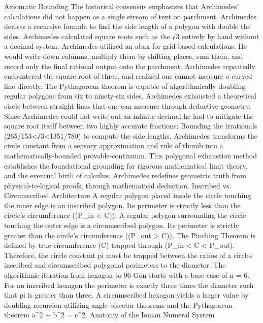 Axiomatic Bounding
The historical consensus emphasizes that Archimedes’ calculations did not happen as a single stream of text on parchment. Archimedes derives a recursive formula to find the side length of a polygon with double the sides. Archimedes calculated square roots such as the √3 entirely by hand without a decimal system. Archimedes utilized an abax for grid-based calculations. He would write down columns, multiply them by shifting places, sum them, and record only the final rational output onto the parchment. Archimedes repeatedly encountered the square root of three, and realized one cannot measure a curved line directly. The Pythagorean theorem is capable of algorithmically doubling regular polygons from six to ninety-six sides. Archimedes exhausted a theoretical circle between straight lines that one can measure through deductive geometry. Since Archimedes could not write out an infinite decimal he had to mitigate the square root itself between two highly accurate fractions:
Bounding the irrationals ({265}/{153}<{√3}<{1351}/{780}) to compute the side lengths.
Archimedes transforms the circle constant from a sensory approximation and rule of thumb into a mathematically-bounded provable-continuum. This polygonal exhaustion method establishes the foundational grounding for rigorous mathematical limit theory, and the eventual birth of calculus. Archimedes redefines geometric truth from physical-to-logical proofs, through mathematical deduction. 
Inscribed vs. Circumscribed Architecture
A regular polygon placed inside the circle touching the inner edge is an inscribed polygon. Its perimeter is strictly less than the circle's circumference ((P_{in} < C)). A regular polygon surrounding the circle touching the outer edge is a circumscribed polygon. Its perimeter is strictly greater than the circle's circumference ((P_{out} > C)). The Pinching Theorem is defined by true circumference (C) trapped through (P_{in} < C < P_{out}). Therefore, the circle constant pi must be trapped between the ratios of a circles inscribed and circumscribed polygonal perimeters to the diameter. The algorithmic iteration from hexagon to 96-Gon starts with a base case of n = 6. For an inscribed hexagon the perimeter is exactly three times the diameter such that pi is greater than three. A circumscribed hexagon yields a larger value by doubling recursion utilizing angle-bisector theorems and the Pythagorean theorem a^2 + b^2 = c^2. 
Anatomy of the Ionian Numeral System
